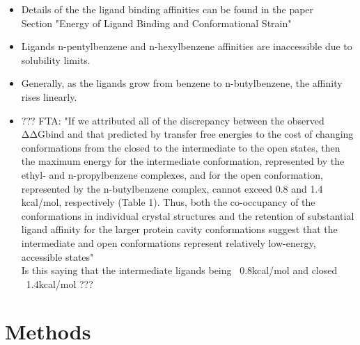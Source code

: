 \documentclass{article}
\begin{document}
    \begin{itemize}
    \item Details of the the ligand binding affinities can be found in the paper \cite{Merski2015}
       \\ Section "Energy of Ligand Binding and Conformational Strain"
    \item Ligands n-pentylbenzene and n-hexylbenzene affinities are inaccessible due to solubility limits.
    \item Generally, as the ligands grow from benzene to n-butylbenzene, the affinity rises linearly.
    \item ??? FTA: "If we attributed all of the discrepancy between the observed ΔΔGbind and that predicted by transfer free energies to the cost of changing conformations from the closed to the intermediate to the open states, then the maximum energy for the intermediate conformation, represented by the ethyl- and n-propylbenzene complexes, and for the open conformation, represented by the n-butylbenzene complex, cannot exceed 0.8 and 1.4 kcal/mol, respectively (Table 1). Thus, both the co-occupancy of the conformations in individual crystal structures and the retention of substantial ligand affinity for the larger protein cavity conformations suggest that the intermediate and open conformations represent relatively low-energy, accessible states"
      \\ Is this saying that the intermediate ligands being ~0.8kcal/mol and closed ~1.4kcal/mol ???
    \end{itemize}

\section{Methods}
\end{document}
